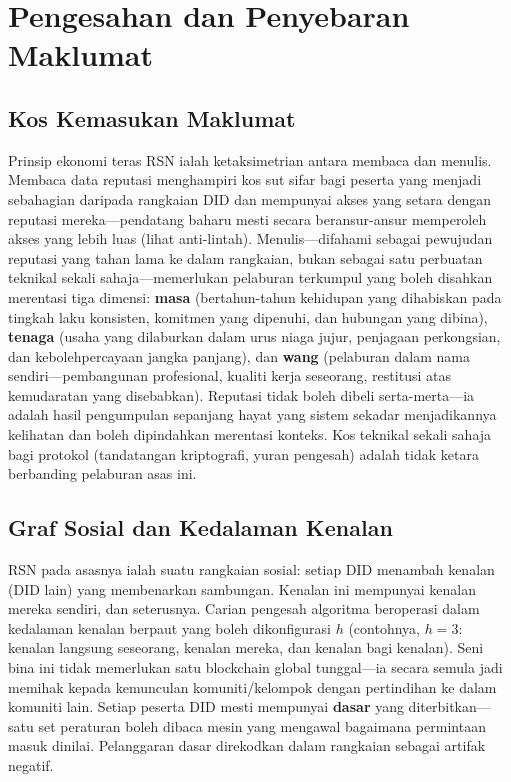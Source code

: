 \documentclass[11pt,a4paper,twocolumn]{article}
\begin{document}
\section{Pengesahan dan Penyebaran Maklumat}

\subsection{Kos Kemasukan Maklumat}

Prinsip ekonomi teras RSN ialah ketaksimetrian antara membaca dan menulis. Membaca data reputasi menghampiri kos sut sifar bagi peserta yang menjadi sebahagian daripada rangkaian DID dan mempunyai akses yang setara dengan reputasi mereka---pendatang baharu mesti secara beransur-ansur memperoleh akses yang lebih luas (lihat anti-lintah). Menulis---difahami sebagai pewujudan reputasi yang tahan lama ke dalam rangkaian, bukan sebagai satu perbuatan teknikal sekali sahaja---memerlukan pelaburan terkumpul yang boleh disahkan merentasi tiga dimensi: \textbf{masa} (bertahun-tahun kehidupan yang dihabiskan pada tingkah laku konsisten, komitmen yang dipenuhi, dan hubungan yang dibina), \textbf{tenaga} (usaha yang dilaburkan dalam urus niaga jujur, penjagaan perkongsian, dan kebolehpercayaan jangka panjang), dan \textbf{wang} (pelaburan dalam nama sendiri---pembangunan profesional, kualiti kerja seseorang, restitusi atas kemudaratan yang disebabkan). Reputasi tidak boleh dibeli serta-merta---ia adalah hasil pengumpulan sepanjang hayat yang sistem sekadar menjadikannya kelihatan dan boleh dipindahkan merentasi konteks. Kos teknikal sekali sahaja bagi protokol (tandatangan kriptografi, yuran pengesah) adalah tidak ketara berbanding pelaburan asas ini.

\subsection{Graf Sosial dan Kedalaman Kenalan}

RSN pada asasnya ialah suatu rangkaian sosial: setiap DID menambah kenalan (DID lain) yang membenarkan sambungan. Kenalan ini mempunyai kenalan mereka sendiri, dan seterusnya. Carian pengesah algoritma beroperasi dalam kedalaman kenalan berpaut yang boleh dikonfigurasi $h$ (contohnya, $h=3$: kenalan langsung seseorang, kenalan mereka, dan kenalan bagi kenalan). Seni bina ini tidak memerlukan satu blockchain global tunggal---ia secara semula jadi memihak kepada kemunculan komuniti/kelompok dengan pertindihan ke dalam komuniti lain. Setiap peserta DID mesti mempunyai \textbf{dasar} yang diterbitkan---satu set peraturan boleh dibaca mesin yang mengawal bagaimana permintaan masuk dinilai. Pelanggaran dasar direkodkan dalam rangkaian sebagai artifak negatif.
\end{document}
